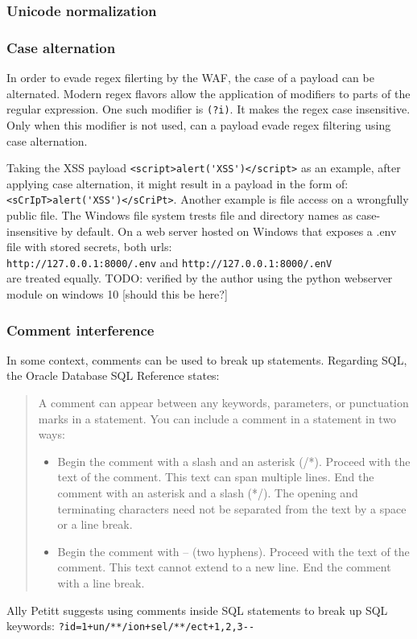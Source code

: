 \subsubsection{Unicode normalization}
{\color{red}
\cite{unicode/normalization}
\cite{medium/allypetitt}
}


\subsubsection{Case alternation}
In order to evade regex filerting by the WAF, the case of a payload can be alternated. \cite{medium/allypetitt}
Modern regex flavors allow the application of modifiers to parts of the regular expression.
One such modifier is \verb|(?i)|. It makes the regex case insensitive. \cite{regex/jan} Only when this modifier is not used, can a payload evade regex filtering using case alternation.

Taking the XSS payload \verb|<script>alert('XSS')</script>| as an example, after applying case alternation, it might result in a payload in the form of: \verb|<sCrIpT>alert('XSS')</sCriPt>|.
Another example is file access on a wrongfully public file.
The Windows file system trests file and directory names as case-insensitive by default. \cite{windows/casesensitive}
On a web server hosted on Windows that exposes a .env file with stored secrets, both urls: \\ \verb|http://127.0.0.1:8000/.env| and \verb|http://127.0.0.1:8000/.enV| \\
are treated equally. {\color{red}TODO: verified by the author using the python webserver module on windows 10 [should this be here?]}


\subsubsection{Comment interference}
In some context, comments can be used to break up statements. Regarding SQL, the Oracle Database SQL Reference states:
\begin{quote}
	A comment can appear between any keywords, parameters, or punctuation marks in a statement. You can include a comment in a statement in two ways:
	\begin{itemize}
		\item Begin the comment with a slash and an asterisk (/*). Proceed with the text of the comment. This text can span multiple lines. End the comment with an asterisk and a slash (*/). The opening and terminating characters need not be separated from the text by a space or a line break.
		\item Begin the comment with -- (two hyphens). Proceed with the text of the comment. This text cannot extend to a new line. End the comment with a line break.
	\end{itemize}
	\cite{oracle/sqlcomments}
\end{quote}
Ally Petitt suggests using comments inside SQL statements to break up SQL keywords: \verb|?id=1+un/**/ion+sel/**/ect+1,2,3--| \cite{medium/allypetitt}


